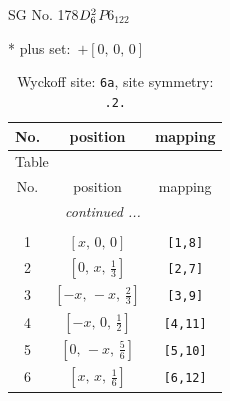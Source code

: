 \documentclass[fleqn,8pt]{jsarticle}
\begin{document}
\setcounter{MaxMatrixCols}{32}

\renewcommand{\tablename}{Table~}
\renewcommand{\figurename}{Figure~}
\begin{center}
\LARGE
SG No. 178\quad$D_{\rm 6}^{2}$\quad$P6_122$\quad[ hexagonal ]
\end{center}
* plus set:\,\,\,$+\left[ 0,\, 0,\, 0 \right]$
\renewcommand{\arraystretch}{1.2}
\begin{longtable}{ccc}
\caption{Wyckoff site: {\tt 6a}, site symmetry: {\tt .2.}}
 \\
 \hline \hline
No. & position & mapping \\ \hline \endfirsthead

\multicolumn{2}{l}{\tablename\ \thetable{}} \\
 \hline \hline
No. & position & mapping \\ \hline \endhead

 \hline \hline
\multicolumn{2}{r}{\footnotesize\it continued ...} \\ \endfoot

 \hline \hline
\multicolumn{2}{r}{} \\ \endlastfoot

1 & $\left[ x,\, 0,\, 0 \right]$ & {\tt [1,8]} \\ \hline
2 & $\left[ 0,\, x,\, \frac{1}{3} \right]$ & {\tt [2,7]} \\ \hline
3 & $\left[ - x,\, - x,\, \frac{2}{3} \right]$ & {\tt [3,9]} \\ \hline
4 & $\left[ - x,\, 0,\, \frac{1}{2} \right]$ & {\tt [4,11]} \\ \hline
5 & $\left[ 0,\, - x,\, \frac{5}{6} \right]$ & {\tt [5,10]} \\ \hline
6 & $\left[ x,\, x,\, \frac{1}{6} \right]$ & {\tt [6,12]} \\
\end{longtable}
\renewcommand{\arraystretch}{1.2}
\end{document}
